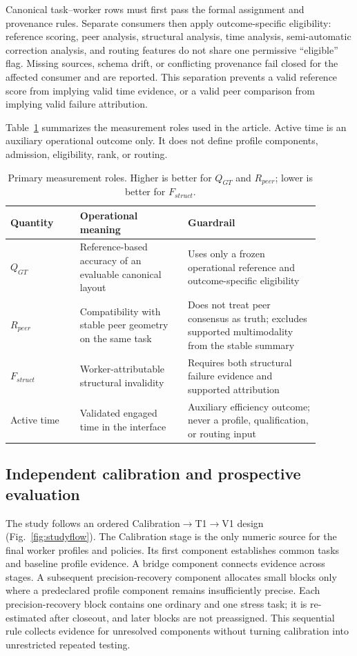 Canonical task--worker rows must first pass the formal assignment and provenance rules. Separate consumers then apply outcome-specific eligibility: reference scoring, peer analysis, structural analysis, time analysis, semi-automatic correction analysis, and routing features do not share one permissive ``eligible'' flag. Missing sources, schema drift, or conflicting provenance fail closed for the affected consumer and are reported. This separation prevents a valid reference score from implying valid time evidence, or a valid peer comparison from implying valid failure attribution.

Table~\ref{tab:outcomes} summarizes the measurement roles used in the article. Active time is an auxiliary operational outcome only. It does not define profile components, admission, eligibility, rank, or routing.

\begin{table}[t]
\centering
\caption{Primary measurement roles. Higher is better for $Q_{GT}$ and $R_{peer}$; lower is better for $F_{struct}$.}
\label{tab:outcomes}
\begin{tabular}{p{0.20\linewidth}p{0.31\linewidth}p{0.38\linewidth}}
\toprule
Quantity & Operational meaning & Guardrail \\
\midrule
$Q_{GT}$ & Reference-based accuracy of an evaluable canonical layout & Uses only a frozen operational reference and outcome-specific eligibility \\
$R_{peer}$ & Compatibility with stable peer geometry on the same task & Does not treat peer consensus as truth; excludes supported multimodality from the stable summary \\
$F_{struct}$ & Worker-attributable structural invalidity & Requires both structural failure evidence and supported attribution \\
Active time & Validated engaged time in the interface & Auxiliary efficiency outcome; never a profile, qualification, or routing input \\
\bottomrule
\end{tabular}
\end{table}

\subsection{Independent calibration and prospective evaluation}

The study follows an ordered Calibration$\rightarrow$T1$\rightarrow$V1 design (Fig.~\ref{fig:studyflow}). The Calibration stage is the only numeric source for the final worker profiles and policies. Its first component establishes common tasks and baseline profile evidence. A bridge component connects evidence across stages. A subsequent precision-recovery component allocates small blocks only where a predeclared profile component remains insufficiently precise. Each precision-recovery block contains one ordinary and one stress task; it is re-estimated after closeout, and later blocks are not preassigned. This sequential rule collects evidence for unresolved components without turning calibration into unrestricted repeated testing.

